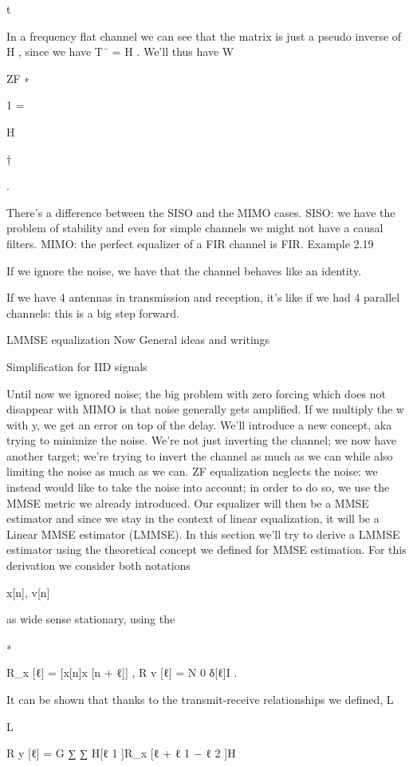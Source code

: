 {t

In a frequency flat channel we can see that the matrix is just a pseudo inverse of H ,
since we have T¯ = H .
We'll thus have W

ZF ∗

1
=

H

†

.

\sqrtG

There's a difference between the SISO and the MIMO cases.
SISO: we have the problem of stability and even for simple channels we might not have a causal filters.
MIMO: the perfect equalizer of a FIR channel is FIR.
Example 2.19

If we ignore the noise, we have that the channel behaves like an identity.

If we have 4 antennas in transmission and reception, it's like if we had 4 parallel channels: this is a big step forward.

LMMSE equalization Now General ideas and writings

Simplification for IID signals

Until now we ignored noise; the big problem with zero forcing which does not disappear with MIMO is that noise generally gets amplified.
If we multiply the w with y, we get an error on top of the delay. We'll introduce a new concept, aka trying to minimize the noise. We're not just inverting the channel; we now have another target; we're trying to invert the channel as much as we can while also limiting the noise as much as we can.
ZF equalization neglects the noise: we instead would like to take the noise into account;
in order to do so, we use the MMSE metric we already introduced. Our equalizer will then be a MMSE estimator and since we stay in the context of linear equalization, it will be a Linear MMSE estimator (LMMSE).
In this section we'll try to derive a LMMSE estimator using the theoretical concept we defined for MMSE estimation.
For this derivation we consider both notations

x[n], v[n]

as wide sense stationary, using the

∗

R_x [ℓ] = [x[n]x [n + ℓ]] ,
R v [ℓ] = N 0 δ[ℓ]I .

It can be shown that thanks to the transmit-receive relationships we defined,
L

L

R y [ℓ] = G ∑ ∑ H[ℓ 1 ]R_x [ℓ + ℓ 1 − ℓ 2 ]H

}
